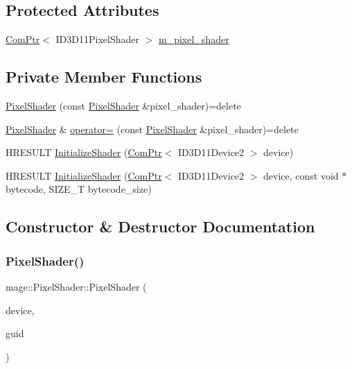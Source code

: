 \subsection*{Protected Attributes}
\begin{DoxyCompactItemize}
\item 
\hyperlink{namespacemage_ae74f374780900893caa5555d1031fd79}{Com\+Ptr}$<$ I\+D3\+D11\+Pixel\+Shader $>$ \hyperlink{classmage_1_1_pixel_shader_a1dd0f87be1c1f7fe5a1bb2737263222f}{m\+\_\+pixel\+\_\+shader}
\end{DoxyCompactItemize}
\subsection*{Private Member Functions}
\begin{DoxyCompactItemize}
\item 
\hyperlink{classmage_1_1_pixel_shader_a361df943e40e9015ac4b769af130ce79}{Pixel\+Shader} (const \hyperlink{classmage_1_1_pixel_shader}{Pixel\+Shader} \&pixel\+\_\+shader)=delete
\item 
\hyperlink{classmage_1_1_pixel_shader}{Pixel\+Shader} \& \hyperlink{classmage_1_1_pixel_shader_ac3a3535b2751237f4aad110dca05d0c3}{operator=} (const \hyperlink{classmage_1_1_pixel_shader}{Pixel\+Shader} \&pixel\+\_\+shader)=delete
\item 
H\+R\+E\+S\+U\+LT \hyperlink{classmage_1_1_pixel_shader_aa4720c76ee456bc136fa4e58de1a03a4}{Initialize\+Shader} (\hyperlink{namespacemage_ae74f374780900893caa5555d1031fd79}{Com\+Ptr}$<$ I\+D3\+D11\+Device2 $>$ device)
\item 
H\+R\+E\+S\+U\+LT \hyperlink{classmage_1_1_pixel_shader_ae9194154f0cb7948ef7d85991f2aa227}{Initialize\+Shader} (\hyperlink{namespacemage_ae74f374780900893caa5555d1031fd79}{Com\+Ptr}$<$ I\+D3\+D11\+Device2 $>$ device, const void $\ast$bytecode, S\+I\+Z\+E\+\_\+T bytecode\+\_\+size)
\end{DoxyCompactItemize}


\subsection{Constructor \& Destructor Documentation}
\hypertarget{classmage_1_1_pixel_shader_a9b47c1bfe4ae686e64e4c91fd8f6cbec}{}\label{classmage_1_1_pixel_shader_a9b47c1bfe4ae686e64e4c91fd8f6cbec} 
\subsubsection{\texorpdfstring{Pixel\+Shader()}{PixelShader()}\hspace{0.1cm}{\footnotesize\ttfamily [1/3]}}
{\footnotesize\ttfamily mage\+::\+Pixel\+Shader\+::\+Pixel\+Shader (\begin{DoxyParamCaption}\item[{\hyperlink{namespacemage_ae74f374780900893caa5555d1031fd79}{Com\+Ptr}$<$ I\+D3\+D11\+Device2 $>$}]{device,  }\item[{const wstring \&}]{guid }\end{DoxyParamCaption})}

